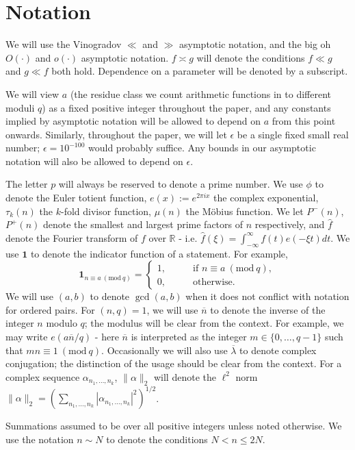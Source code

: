 \documentclass[10pt]{amsart}
\theoremstyle{plain}
\numberwithin{equation}{section}
\newcommand{\Mod}[1]{\ (\mathrm{mod}\ #1)}
\renewcommand{\hat}[1]{\widehat #1}
\begin{document}
\section{Notation}
%
%
%
%
We will use the Vinogradov $\ll$ and $\gg$ asymptotic notation, and the big oh $O(\cdot)$ and $o(\cdot)$ asymptotic notation. $f\asymp g$ will denote the conditions $f\ll g$ and $g\ll f$ both hold. Dependence on a parameter will be denoted by a subscript.

We will view $a$ (the residue class we count arithmetic functions in to different moduli $q$) as a fixed positive integer throughout the paper, and any constants implied by asymptotic notation will be allowed to depend on $a$ from this point onwards. Similarly, throughout the paper, we will let $\epsilon$ be a single fixed small real number; $\epsilon=10^{-100}$ would probably suffice. Any bounds in our asymptotic notation will also be allowed to depend on $\epsilon$.

The letter $p$ will always be reserved to denote a prime number. We use $\phi$ to denote the Euler totient function, $e(x):=e^{2\pi i x}$ the complex exponential, $\tau_k(n)$ the $k$-fold divisor function, $\mu(n)$ the M\"obius function. We let $P^-(n)$, $P^+(n)$ denote the smallest and largest prime factors of $n$ respectively, and $\hat{f}$ denote the Fourier transform of $f$ over $\mathbb{R}$ - i.e. $\hat{f}(\xi)=\int_{-\infty}^{\infty}f(t)e(-\xi t)dt$. We use $\mathbf{1}$ to denote the indicator function of a statement. For example,
\[
\mathbf{1}_{n\equiv a\Mod{q}}=\begin{cases}1,\qquad &\text{if }n\equiv a\Mod{q},\\
0,&\text{otherwise}.
\end{cases}
\]
We will use $(a,b)$ to denote $\gcd(a,b)$ when it does not conflict with notation for ordered pairs. For $(n,q)=1$, we will use $\overline{n}$ to denote the inverse of the integer $n$ modulo $q$; the modulus will be clear from the context. For example, we may write $e(a\overline{n}/q)$ - here $\overline{n}$ is interpreted as the integer $m\in \{0,\dots,q-1\}$ such that $m n\equiv 1\Mod{q}$. Occasionally we will also use $\overline{\lambda}$ to denote complex conjugation; the distinction of the usage should be clear from the context.  For a complex sequence $\alpha_{n_1,\dots,n_k}$, $\|\alpha\|_2$ will denote the $\ell^2$ norm $\|\alpha\|_2=(\sum_{n_1,\dots,n_k}|\alpha_{n_1,\dots,n_k}|^2)^{1/2}$.

Summations assumed to be over all positive integers unless noted otherwise. We use the notation $n\sim N$ to denote the conditions $N<n\le 2N$.
\end{document}
